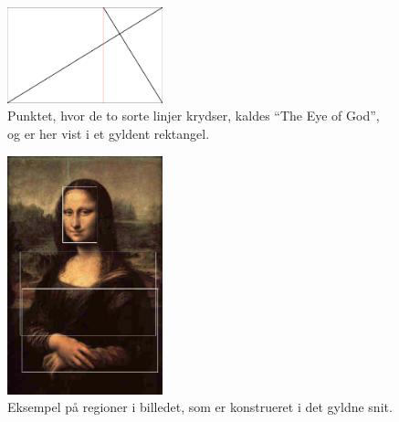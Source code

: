 {\begin{figure}[!h]
    \centering
    \includegraphics[angle=0,width=0.4\textwidth]{afsnit/fremtidigt_arbejde/billeder/eye_of_god}
    \caption[]{Punktet, hvor de to sorte linjer krydser, kaldes ``The Eye
    of God'', og er her vist i et gyldent rektangel.}
    \label{eye_of_god}
\end{figure}

\begin{figure}[!h]
    \centering
    \includegraphics[angle=0,width=0.4\textwidth]{afsnit/fremtidigt_arbejde/billeder/monalisa_fake.jpg}
    \caption[]{Eksempel på regioner i billedet, som er konstrueret i det
    gyldne snit.}
    \label{monalisa_fake}
\end{figure}

}
